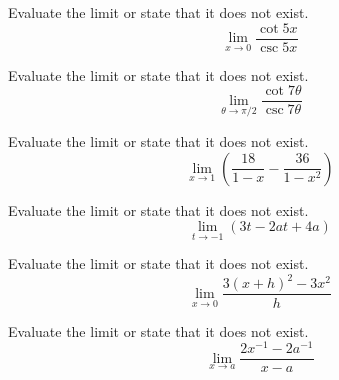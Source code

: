 \documentclass[12pt,addpoints, answers, fleqn]{exam}
\begin{document}
\begin{teacher}
\begin{questions}
\question 	%

Evaluate the limit or state that it does not exist.
\[
\lim_{x \to 0} \frac{\cot 5x}{\csc 5x}
\]


\begin{solution}
\end{solution}

\question 	%

Evaluate the limit or state that it does not exist.
\[
\lim_{\theta \to \pi/2} \frac{\cot 7 \theta}{\csc 7 \theta}
\]


\begin{solution}
\end{solution}

\question 	%

Evaluate the limit or state that it does not exist.
\[
\lim_{x \to 1} \left( \frac{18}{1-x} - \frac{36}{1-x^2} \right)
\]


\begin{solution}
\end{solution}

\question 	%

Evaluate the limit or state that it does not exist.
\[
\lim_{t \to -1} \left( 3t - 2at + 4a \right)
\]


\begin{solution}
\end{solution}

\question 	%

Evaluate the limit or state that it does not exist.
\[
\lim_{x \to 0} \frac{3\left(x+h\right)^2-3x^2}{h}
\]


\begin{solution}
\end{solution}

\question 	%

Evaluate the limit or state that it does not exist.
\[
\lim_{x \to a} \frac{2x^{-1}-2a^{-1}}{x-a}
\]


\begin{solution}
\end{solution}

\end{questions}

\end{teacher}
\vfill
\pagebreak

\end{document}
